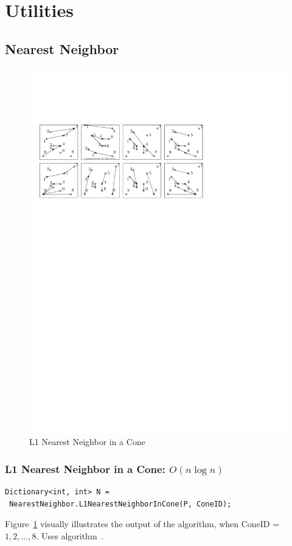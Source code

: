 \documentclass{article}
\begin{document}
\newpage
\section{Utilities}

\subsection{Nearest Neighbor}

\begin{figure}[h]
\includegraphics[width=\textwidth]{Figures/NearestNeighborinaCone.pdf}
\caption{L1 Nearest Neighbor in a Cone}
\label{fig:NearestNeighborinaCone}
\end{figure}

\subsubsection{L1 Nearest Neighbor in a Cone: $O(n \log n)$}
\begin{lstlisting}
Dictionary<int, int> N =
 NearestNeighbor.L1NearestNeighborInCone(P, ConeID);
\end{lstlisting}
Figure~\ref{fig:NearestNeighborinaCone} visually illustrates the output of the algorithm, when ConeID = $1,2,\ldots, 8$. Uses algorithm~\cite{?}.
\end{document}
